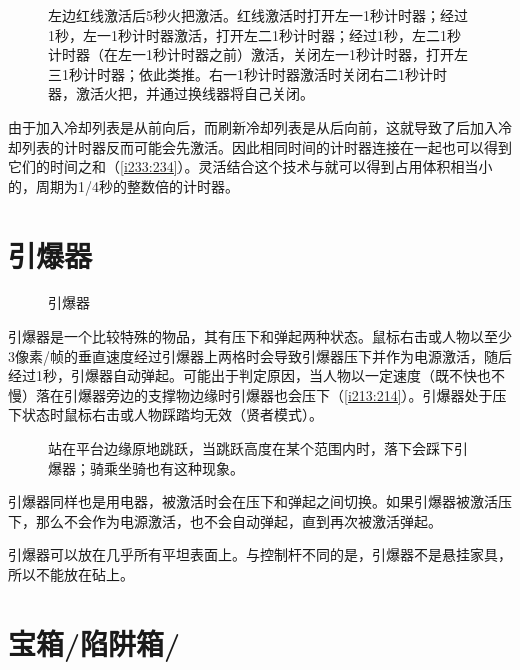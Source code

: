 \begin{figure}[!ht]
  \centering
  \qquad
  \caption{左边红线激活后5秒火把激活。红线激活时打开左一1秒计时器；经过1秒，左一1秒计时器激活，打开左二1秒计时器；经过1秒，左二1秒计时器（在左一1秒计时器之前）激活，关闭左一1秒计时器，打开左三1秒计时器；依此类推。右一1秒计时器激活时关闭右二1秒计时器，激活火把，并通过换线器将自己关闭。}
  \label{i233:234}
\end{figure}

由于加入冷却列表是从前向后，而刷新冷却列表是从后向前，这就导致了后加入冷却列表的计时器反而可能会先激活。因此相同时间的计时器连接在一起也可以得到它们的时间之和（\autoref{i233:234}）。灵活结合这个技术与就可以得到占用体积相当小的，周期为1/4秒的整数倍的计时器。

\section{引爆器}\label{sec:detonator}
\begin{figure}[!ht]
  \centering
  \caption{引爆器}
\end{figure}
引爆器是一个比较特殊的物品，其有压下和弹起两种状态。鼠标右击或人物以至少3像素/帧的垂直速度经过引爆器上两格时会导致引爆器压下并作为电源激活，随后经过1秒，引爆器自动弹起。可能出于判定原因，当人物以一定速度（既不快也不慢）落在引爆器旁边的支撑物边缘时引爆器也会压下（\autoref{i213:214}）。引爆器处于压下状态时鼠标右击或人物踩踏均无效（贤者模式）。

\begin{figure}[!ht]
  \centering
  \qquad
  \caption{\protect{}站在平台边缘原地跳跃，当跳跃高度在某个范围内时，落下会踩下引爆器；\protect{}骑乘坐骑也有这种现象。}
  \label{i213:214}
\end{figure}

引爆器同样也是用电器，被激活时会在压下和弹起之间切换。如果引爆器被激活压下，那么不会作为电源激活，也不会自动弹起，直到再次被激活弹起。

引爆器可以放在几乎所有平坦表面上。与控制杆不同的是，引爆器不是悬挂家具，所以不能放在砧上。

\section{宝箱/陷阱箱/\DeadMansChest}\label{sec:TrappedChest}\label{sec:DeadMansChest}\label{sec:chest}

